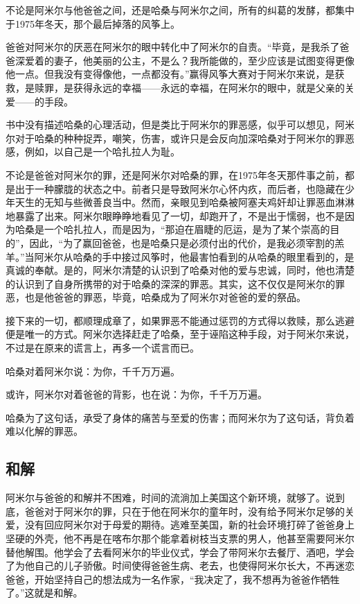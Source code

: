 \documentclass[openany,scheme = chinese, linespread = 1.5]{ctexbook}
\begin{document}
不论是阿米尔与他爸爸之间，还是哈桑与阿米尔之间，所有的纠葛的发酵，都集中于1975年冬天，那个最后掉落的风筝上。

爸爸对阿米尔的厌恶在阿米尔的眼中转化中了阿米尔的自责。“毕竟，是我杀了爸爸深爱着的妻子，他美丽的公主，不是么？我所能做的，至少应该是试图变得更像他一点。但我没有变得像他，一点都没有。”赢得风筝大赛对于阿米尔来说，是获救，是赎罪，是获得永远的幸福——永远的幸福，在阿米尔的眼中，就是父亲的关爱——的手段。

书中没有描述哈桑的心理活动，但是类比于阿米尔的罪恶感，似乎可以想见，阿米尔对于哈桑的种种捉弄，嘲笑，伤害，或许只是会反向加深哈桑对于阿米尔的罪恶感，例如，以自己是一个哈扎拉人为耻。

不论是爸爸对阿米尔的罪，还是阿米尔对哈桑的罪，在1975年冬天那件事之前，都是出于一种朦胧的状态之中。前者只是导致阿米尔心怀内疚，而后者，也隐藏在少年天生的无知与些微善良当中。然而，亲眼见到哈桑被阿塞夫鸡奸却让罪恶血淋淋地暴露了出来。阿米尔眼睁睁地看见了一切，却跑开了，不是出于懦弱，也不是因为哈桑是一个哈扎拉人，而是因为，“那迫在眉睫的厄运，是为了某个崇高的目的”，因此，“为了赢回爸爸，也是哈桑只是必须付出的代价，是我必须宰割的羔羊。”当阿米尔从哈桑的手中接过风筝时，他最害怕看到的从哈桑的眼里看到的，是真诚的奉献。是的，阿米尔清楚的认识到了哈桑对他的爱与忠诚，同时，他也清楚的认识到了自身所携带的对于哈桑的深深的罪恶。其实，这不仅仅是阿米尔的罪恶，也是他爸爸的罪恶，毕竟，哈桑成为了阿米尔对爸爸的爱的祭品。

接下来的一切，都顺理成章了，如果罪恶不能通过惩罚的方式得以救赎，那么逃避便是唯一的方式。阿米尔选择赶走了哈桑，至于诬陷这种手段，对于阿米尔来说，不过是在原来的谎言上，再多一个谎言而已。

哈桑对着阿米尔说：为你，千千万万遍。

或许，阿米尔对着爸爸的背影，也在说：为你，千千万万遍。

哈桑为了这句话，承受了身体的痛苦与至爱的伤害；而阿米尔为了这句话，背负着难以化解的罪恶。

\subsection*{和解}

阿米尔与爸爸的和解并不困难，时间的流淌加上美国这个新环境，就够了。说到底，爸爸对于阿米尔的罪，只在于他在阿米尔的童年时，没有给予阿米尔足够的关爱，没有回应阿米尔对于母爱的期待。逃难至美国，新的社会环境打碎了爸爸身上坚硬的外壳，他不再是在喀布尔那个能拿着树枝当支票的男人，他甚至需要阿米尔替他解围。他学会了去看阿米尔的毕业仪式，学会了带阿米尔去餐厅、酒吧，学会了为他自己的儿子骄傲。时间使得爸爸生病、老去，也使得阿米尔长大，不再迷恋爸爸，开始坚持自己的想法成为一名作家，“我决定了，我不想再为爸爸作牺牲了。”这就是和解。
\end{document}
